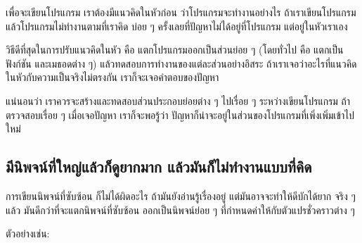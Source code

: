 เพื่อจะเขียนโปรแกรม
เราต้องมีแนวคิดในหัวก่อน
ว่าโปรแกรมจะทำงานอย่างไร
ถ้าเราเขียนโปรแกรม
แล้วโปรแกรมไม่ทำงานตามที่เราคิด
บ่อย ๆ ครั้งเลยที่ปัญหาไม่ได้อยู่ที่โปรแกรม
แต่อยู่ในหัวเราเอง



วิธีดีที่สุดในการปรับแนวคิดในหัว
คือ แตกโปรแกรมออกเป็นส่วนย่อย ๆ (โดยทั่วไป คือ 
แตกเป็นฟังก์ชัน และเมธอดต่าง ๆ)
แล้วทดสอบการทำงานของแต่ละส่วนอย่างอิสระ
ถ้าเราเจอว่าอะไรที่แนวคิดในหัวกับความเป็นจริงไม่ตรงกัน
เราก็จะเจอคำตอบของปัญหา


แน่นอนว่า เราควรจะสร้างและทดสอบส่วนประกอบย่อยต่าง ๆ ไปเรื่อย ๆ ระหว่างเขียนโปรแกรม
ถ้าตรวจสอบเรื่อย ๆ 
เมื่อเจอปัญหา
เราก็จะพอรู้ว่า ปัญหาก็น่าจะอยู่ในส่วนของโปรแกรมที่เพิ่งเพิ่มเข้าไปใหม่


\subsection{มีนิพจน์ที่ใหญ่แล้วก็ดูยากมาก
แล้วมันก็ไม่ทำงานแบบที่คิด}



การเขียนนิพจน์ที่ซับซ้อน ก็ไม่ได้ผิดอะไร ถ้ามันยังอ่านรู้เรื่องอยู่
แต่มันอาจจะทำให้ดีบักได้ยาก
จริง ๆ แล้ว มันดีกว่าที่จะแตกนิพจน์ที่ซับซ้อน
ออกเป็นนิพจน์ย่อย ๆ ที่กำหนดค่าให้กับตัวแปรชั่วคราวต่าง ๆ


ตัวอย่างเช่น:

